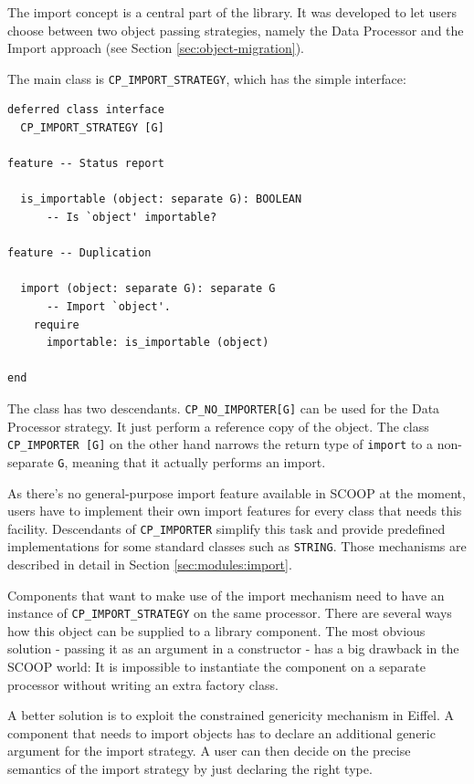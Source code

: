The import concept is a central part of the library.
It was developed to let users choose between two object passing strategies, namely the Data Processor and the Import approach (see Section \ref{sec:object-migration}).

The main class is \lstinline!CP_IMPORT_STRATEGY!, which has the simple interface:

\begin{lstlisting}[language=OOSC2Eiffel, captionpos=b, caption={The deferred class CP\_IMPORT\_STRATEGY.}]
deferred class interface
  CP_IMPORT_STRATEGY [G]

feature -- Status report

  is_importable (object: separate G): BOOLEAN
      -- Is `object' importable?

feature -- Duplication

  import (object: separate G): separate G
      -- Import `object'.
    require
      importable: is_importable (object)

end
\end{lstlisting}


The class has two descendants.
\lstinline!CP_NO_IMPORTER[G]! can be used for the Data Processor strategy. 
It just perform a reference copy of the object.
The class \lstinline!CP_IMPORTER [G]! on the other hand narrows the return type of \lstinline!import! to a non-separate \lstinline!G!, meaning that it actually performs an import.

As there's no general-purpose import feature available in SCOOP at the moment, users have to implement their own import features for every class that needs this facility.
Descendants of \lstinline!CP_IMPORTER! simplify this task and provide predefined implementations for some standard classes such as \lstinline!STRING!.
Those mechanisms are described in detail in Section \ref{sec:modules:import}.

Components that want to make use of the import mechanism need to have an instance of \lstinline!CP_IMPORT_STRATEGY! on the same processor.
There are several ways how this object can be supplied to a library component.
The most obvious solution - passing it as an argument in a constructor - has a big drawback in the SCOOP world:
It is impossible to instantiate the component on a separate processor without writing an extra factory class.

A better solution is to exploit the constrained genericity mechanism in Eiffel.
A component that needs to import objects has to declare an additional generic argument for the import strategy.
A user can then decide on the precise semantics of the import strategy by just declaring the right type.

